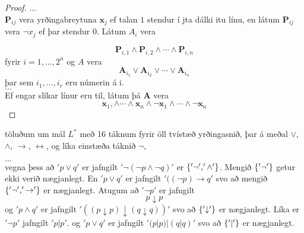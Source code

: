 \documentclass[12pt]{article}
\begin{document}


\begin{proof}
  $\hdots$ \\
  $ \textbf{P}_{ij}$ vera yrðingabreytuna $\textbf{x}_j$ ef talan $1$ stendur í
  j\-ta dálki i\-tu línu, en látum $\textbf{P}_{ij}$ vera $\lnot x_j$ ef
  þar stendur 0.  Látum $A_{i}$ vera

  \[ \textbf{P}_{i,1} \wedge \textbf{P}_{i,2} \wedge \dotsb \wedge
  \textbf{P}_{i,n} \] fyrir $i = 1, \dotsc, 2^n$ og $A$ vera
  \[ \textbf{A}_{i_1} \vee \textbf{A}_{i_2} \vee \dotsb \vee \textbf{A}_{i_n} \] þar
  sem $i_1, \dotsc, i_r$ eru númerin á i.\\

  $\hdots$ \\
  Ef engar slíkar línur eru til, látum þá $\textbf{A}$ vera
  \[ \textbf{x}_1, \wedge \dotsb \wedge \textbf{x}_n \wedge \lnot \textbf{x}_1 \wedge
  \dotsb \wedge \lnot \textbf{x}_n \]
\end{proof}

töluðum um mál $L^{*}$ með 16 táknum fyrir öll tvístæð yrðingasnið, þar á meðal
$\vee$, $\wedge$, $\rightarrow$, $\leftrightarrow$, og líka einstæða táknið $\lnot$,



$\hdots$\\


vegna þess að $'p \vee q'$ er jafngilt $'\lnot ( \lnot p \wedge  \lnot q)'$
er $\{'\lnot', '\wedge'\}$. Mengið $\{'\lnot'\}$ getur ekki verið nægjanlegt.
En $'p \vee q'$ er jafngilt $'((\lnot p) \rightarrow q'$ svo að mengið
$\{'\lnot', '\rightarrow'\}$ er nægjanlegt. Atugum að $'\lnot p'$ er jafngilt
\[p \downarrow p\]
og
$'p \wedge q'$ er jafngilt $'(( p \downarrow p) \downarrow (q \downarrow q))'$
svo að $\{'\downarrow'\}$ er nægjanlegt. Líka er
$'\lnot p'$ jafngilt $'p | p'$.
og $'p \vee q'$ er jafngilt $'(p | p) | (q|q)'$ svo að $\{'|'\}$ er nægjanlegt.
\end{document}
